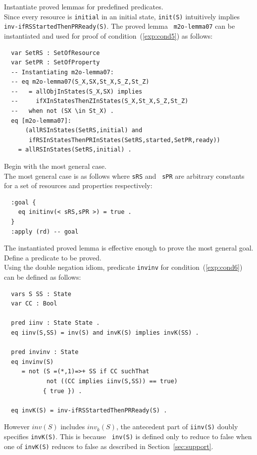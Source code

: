 \documentclass[12pt]{report}
\newcommand{\stt}[1]{{\small{\tt {#1}}}}
\begin{document}
 Instantiate proved lemmas for predefined
predicates. \\ Since every resource is {\tt initial} in an initial
state, \stt{init(S)} intuitively implies \\
\stt{inv-ifRSStartedThenPRReady(S)}. The proved lemma {\tt
  m2o-lemma07} can be instantiated and used for proof of
condition~(\ref{exp:cond5}) as follows:
\begin{verbatim}
  var SetRS : SetOfResource
  var SetPR : SetOfProperty
  -- Instantiating m2o-lemma07:
  -- eq m2o-lemma07(S_X,SX,St_X,S_Z,St_Z)
  --   = allObjInStates(S_X,SX) implies 
  --     ifXInStatesThenZInStates(S_X,St_X,S_Z,St_Z)
  --   when not (SX \in St_X) .
  eq [m2o-lemma07]:
      (allRSInStates(SetRS,initial) and 
       ifRSInStatesThenPRInStates(SetRS,started,SetPR,ready))
    = allRSInStates(SetRS,initial) .
\end{verbatim}

\vspace{0.3cm}
 Begin with the most general case. \\
The most general case is as follows where {\tt sRS} and {\tt
  sPR} are arbitrary constants for a set of resources and properties
respectively:
\begin{verbatim}
  :goal {
    eq initinv(< sRS,sPR >) = true .
  }
  :apply (rd) -- goal
\end{verbatim}
The instantiated proved lemma is effective enough to prove the most
general goal.\\

 Define a predicate to be proved. \\ Using the
double negation idiom, predicate {\tt invinv} for
condition~(\ref{exp:cond6}) can be defined as follows:
\begin{verbatim}
  vars S SS : State
  var CC : Bool

  pred iinv : State State .
  eq iinv(S,SS) = inv(S) and invK(S) implies invK(SS) .

  pred invinv : State
  eq invinv(S)
     = not (S =(*,1)=>+ SS if CC suchThat
            not ((CC implies iinv(S,SS)) == true)
     	   { true }) .

  eq invK(S) = inv-ifRSStartedThenPRReady(S) .
\end{verbatim}
However $inv(S)$ includes $inv_k(S)$, the antecedent part of
\stt{iinv(S)} doubly specifies \stt{invK(S)}. This is because {\tt
  inv(S)} is defined only to reduce to false when one of {\tt invK(S)}
reduces to false as described in Section~\ref{sec:support}.\\
\end{document}
